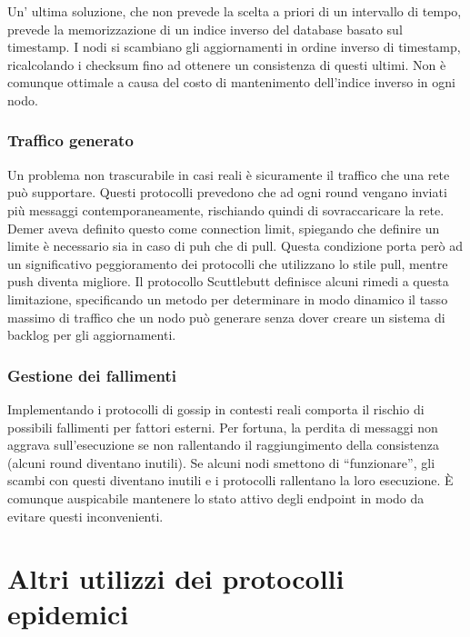 Un' ultima soluzione, che non prevede la scelta a priori di un intervallo di tempo, prevede la memorizzazione di un indice inverso del database basato sul timestamp. I nodi si scambiano gli aggiornamenti in ordine inverso di timestamp, ricalcolando i checksum fino ad ottenere un consistenza di questi ultimi. Non è comunque ottimale a causa del costo di mantenimento dell’indice inverso in ogni nodo.

\subsubsection{Traffico generato}
Un problema non trascurabile in casi reali è sicuramente il traffico che una rete può supportare. Questi protocolli prevedono che ad ogni round vengano inviati più messaggi contemporaneamente, rischiando quindi di sovraccaricare la rete. Demer aveva definito questo come connection limit, spiegando che definire un limite è necessario sia in caso di puh che di pull. Questa condizione porta però ad un significativo peggioramento dei protocolli che utilizzano lo stile pull, mentre push diventa migliore. Il protocollo Scuttlebutt \cite{flowgossip} definisce alcuni rimedi a questa limitazione, specificando un metodo per determinare in modo dinamico il tasso massimo di traffico che un nodo può generare senza dover creare un sistema di backlog per gli aggiornamenti. 

\subsubsection{Gestione dei fallimenti}
Implementando i protocolli di gossip in contesti reali comporta il rischio di possibili fallimenti per fattori esterni. Per fortuna, la perdita di messaggi non aggrava sull’esecuzione se non rallentando il raggiungimento della consistenza (alcuni round diventano inutili). Se alcuni nodi smettono di “funzionare”, gli scambi con questi diventano inutili e i protocolli rallentano la loro esecuzione. È comunque auspicabile mantenere lo stato attivo degli endpoint in modo da evitare questi inconvenienti.

\section{Altri utilizzi dei protocolli epidemici}

